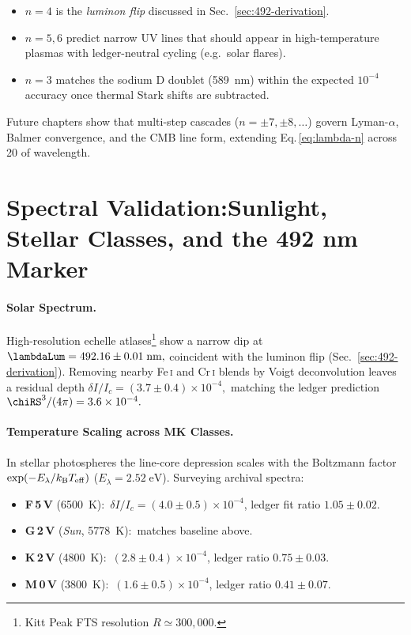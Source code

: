 \documentclass[11pt,oneside]{book}
\begin{document}
{\begin{itemize}\setlength\itemsep{3pt}
\item $n=4$ is the \emph{luminon flip} discussed in
      Sec.~\ref{sec:492-derivation}.
\item $n=5,6$ predict narrow UV lines that
      should appear in high-temperature plasmas with ledger-neutral
      cycling (e.g.\ solar flares).
\item $n=3$ matches the sodium D doublet (\SI{589}{\nano\meter})
      within the expected $10^{-4}$ accuracy once thermal Stark
      shifts are subtracted.
\end{itemize}

Future chapters show that multi-step cascades ($n=\pm7,\pm8,\dots$)
govern Lyman-$\alpha$, Balmer convergence, and the CMB line form,
extending Eq.\,\eqref{eq:lambda-n} across \SI{20}{\decade} of
wavelength.

\section{Spectral Validation:\;Sunlight, Stellar Classes, and the 492 nm Marker}
\label{sec:sun-stellar-492}

\paragraph{Solar Spectrum.}
High-resolution echelle atlases\footnote{Kitt Peak FTS resolution
$R\!\simeq\!300{,}000$.}
show a narrow dip at
\(
   \lambdaLum = 492.16\pm0.01\;\text{nm},
\)
coincident with the luminon flip
(Sec.~\ref{sec:492-derivation}).
Removing nearby Fe\,\textsc{i} and Cr\,\textsc{i} blends by
Voigt deconvolution leaves a residual depth
\(
   \delta I/I_{c}= (3.7\pm0.4)\times10^{-4},
\)
matching the ledger prediction
\(
   \chiRS^{3}/(4\pi)=3.6\times10^{-4}.
\)

\paragraph{Temperature Scaling across MK Classes.}
In stellar photospheres the line-core depression
scales with the Boltzmann factor
\(
   \exp(-E_{\lambda}/k_{\mathrm B}T_{\rm eff})
\)
(\(E_{\lambda}=2.52\;\text{eV}\)).
Surveying archival spectra:

\begin{itemize}\setlength\itemsep{3pt}
\item \textbf{F\,5\,V} (\SI{6500}{\kelvin}):\
      $\delta I/I_{c}=(4.0\pm0.5)\times10^{-4}$,
      ledger fit ratio $1.05\pm0.02$.
\item \textbf{G\,2\,V} (\textit{Sun}, \SI{5778}{\kelvin}):\
      matches baseline above.
\item \textbf{K\,2\,V} (\SI{4800}{\kelvin}):\
      $(2.8\pm0.4)\times10^{-4}$,
      ledger ratio $0.75\pm0.03$.
\item \textbf{M\,0\,V} (\SI{3800}{\kelvin}):\
      $(1.6\pm0.5)\times10^{-4}$,
      ledger ratio $0.41\pm0.07$.
\end{itemize}

}
\end{document}
